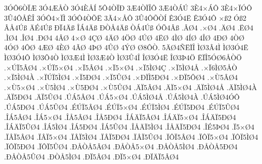 {3^^d3^^d46^^d2^^cf^^c6
3^^d34^^c6^^c5^^d2
3^^d34^^c8^^c5^^cd
5^^d44^^d2^^cf^^d0
3^^c64^^d2^^cf^^ce^^d4
3^^c64^^d2^^c1^^da
3^^c84^^d7^^c1^^d4
3^^c84^^d7^^cf^^d3^^d4
3^^db4^^d4^^c5^^ca^^ce
3^^d3^^d44^^d7^^cf^^cc
3^^d3^^d44^^d2^^d5^^cb
3^^c34^^d7^^c5^^d4
3^^db4^^d4^^d5^^d2^^cd
^^ca3^^d34^^cb
^^ca3^^d34^^d4
^^d7^^df2
^^d3^^df2
^^c2^^c54^^da^^df
^^c4^^c94^^da^^df
^^d0^^cf4^^c4^^df
^^ce^^c14^^c4^^df
^^d0^^d2^^c54^^c4^^df
^^d2^^c14^^da^^df
^^d3^^d54^^c2^^df
.^^c2^^d84
.^^d7^^d84
.^^c4^^d84
.^^cb^^d84
.^^cc^^d84
.^^ce^^d84
.^^d0^^d84
4^^c2^^d8
4^^d7^^d8
4^^c7^^d8
4^^c4^^d8
4^^d6^^d8
4^^da^^d8
4^^cb^^d8
4^^cc^^d8
4^^cd^^d8
4^^ce^^d8
4^^d0^^d8
4^^d2^^d8
4^^d3^^d8
4^^d4^^d8
4^^c6^^d8
4^^c8^^d8
4^^c3^^d8
4^^de^^d8
4^^db^^d8
4^^dd^^d8
^^d88^^d4^^d2.
5^^c4^^d84^^d1^^cb^^cf^^ce
^^cc^^d83^^c24^^cc
^^cc^^d83^^d34^^cb
^^cc^^d83^^d34^^d4
^^cc^^d83^^d44^^d2
^^cc^^d83^^c64^^cc
^^cc^^d83^^c64^^d2
^^cc^^d83^^db4^^ce
^^ce^^d83^^d34^^cb
^^ce^^d83^^de4^^d6
^^cb^^cf^^ce5^^d3^^d86^^c5^^d2^^d6
.^^d7^^da^^cf5^^c2^^d84
.^^d7^^da^^cf5^^d7^^d84
.^^d7^^cf5^^c2^^d84
.^^d7^^cf5^^d7^^d84
.^^d7^^cf5^^cc^^d84^^c7
.^^d7^^cf5^^cc^^d84^^c5
.^^d7^^cf6^^cc^^d85^^c5^^d2
.^^d7^^cf5^^cc^^d84^^c0
.^^d7^^cf^^da^^cf5^^cc^^d84
.^^d7^^cf5^^d0^^d84
.^^d7^^cf5^^db^^d84
.^^d7^^d0^^cf^^cc5^^d0^^d84
.^^d7^^d0^^cf5^^d4^^d84
.^^d7^^d95^^c2^^d84
.^^d7^^d95^^d7^^d84
.^^d7^^d95^^cc^^d84
.^^d7^^d95^^d0^^d84
.^^d7^^d95^^db^^d84
.^^c4^^cf5^^c2^^d84
.^^c4^^cf5^^d7^^d84
.^^c4^^cf5^^cc^^d84^^c5
.^^c4^^cf5^^cc^^d84^^c0
.^^c4^^cf5^^d0^^d84
.^^c4^^cf5^^db^^d84
.^^da^^c15^^c2^^d84
.^^da^^c15^^d7^^d84
.^^da^^c15^^cc^^d84^^c5
.^^da^^c15^^cc^^d84^^c0
.^^da^^c15^^cc^^d84^^d3^^d4
.^^da^^c15^^d0^^d84
.^^da^^c15^^db^^d84
.^^c9^^da^^cf5^^c2^^d84
.^^c9^^da^^cf5^^d7^^d84
.^^c9^^da^^cf5^^cc^^d84
.^^c9^^da^^cf5^^d0^^d84
.^^c9^^da^^cf5^^db^^d84
.^^ce^^c15^^c2^^d84
.^^ce^^c15^^d7^^d84
.^^ce^^c55^^c2^^d84
.^^ce^^c55^^d0^^d84
.^^ce^^c1^^c4^^cf5^^c2^^d84
.^^ce^^c1^^c4^^cf5^^d7^^d84
.^^ce^^c1^^c4^^cf5^^d0^^d84
.^^ce^^c1^^c4^^cf5^^db^^d84
.^^ce^^c15^^cc^^d84
.^^ce^^c15^^d0^^d84
.^^ce^^c15^^db^^d84
.^^ce^^c5^^c4^^cf5^^cc^^d84
.^^ce^^c5^^c4^^cf5^^d0^^d84
.^^ce^^c95^^de^^d84
.^^cf5^^d7^^d84
.^^cf^^c2^^cf5^^c2^^d84
.^^cf^^c2^^cf5^^d7^^d84
.^^cf^^c2^^cf5^^cc^^d84
.^^cf^^c2^^cf5^^d0^^d84
.^^cf^^c2^^cf5^^db^^d84
.^^cf^^d4^^cf5^^c2^^d84
.^^cf^^d4^^cf5^^d7^^d84
.^^cf^^d4^^cf5^^cc^^d84
.^^cf^^d4^^cf5^^d0^^d84
.^^cf^^d4^^cf5^^db^^d84
.^^d0^^c5^^d2^^c55^^c2^^d84
.^^d0^^c5^^d2^^c55^^d7^^d84
.^^d0^^c5^^d2^^c55^^cc^^d84
.^^d0^^c5^^d2^^c55^^d0^^d84
.^^d0^^c5^^d2^^c55^^db^^d84
.^^d0^^d2^^c55^^cc^^d84
.^^d0^^cf5^^c2^^d84
.^^d0^^cf5^^d7^^d84
.^^d0^^cf^^c4^^cf5^^c2^^d84
}
